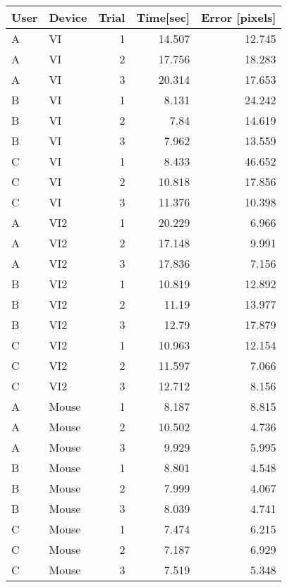 \begin{tabular}{llrrr}
 \toprule
 User & Device & Trial & Time[sec] & Error [pixels] \\
 \midrule
A	&	VI	&	1	&	14.507	&	12.745	\\
A	&	VI	&	2	&	17.756	&	18.283	\\
A	&	VI	&	3	&	20.314	&	17.653	\\
B	&	VI	&	1	&	8.131	&	24.242	\\
B	&	VI	&	2	&	7.84	&	14.619	\\
B	&	VI	&	3	&	7.962	&	13.559	\\
C	&	VI	&	1	&	8.433	&	46.652	\\
C	&	VI	&	2	&	10.818	&	17.856	\\
C	&	VI	&	3	&	11.376	&	10.398	\\
A	&	VI2	&	1	&	20.229	&	6.966	\\
A	&	VI2	&	2	&	17.148	&	9.991	\\
A	&	VI2	&	3	&	17.836	&	7.156	\\
B	&	VI2	&	1	&	10.819	&	12.892	\\
B	&	VI2	&	2	&	11.19	&	13.977	\\
B	&	VI2	&	3	&	12.79	&	17.879	\\
C	&	VI2	&	1	&	10.963	&	12.154	\\
C	&	VI2	&	2	&	11.597	&	7.066	\\
C	&	VI2	&	3	&	12.712	&	8.156	\\
A	&	Mouse	&	1	&	8.187	&	8.815	\\
A	&	Mouse	&	2	&	10.502	&	4.736	\\
A	&	Mouse	&	3	&	9.929	&	5.995	\\
B	&	Mouse	&	1	&	8.801	&	4.548	\\
B	&	Mouse	&	2	&	7.999	&	4.067	\\
B	&	Mouse	&	3	&	8.039	&	4.741	\\
C	&	Mouse	&	1	&	7.474	&	6.215	\\
C	&	Mouse	&	2	&	7.187	&	6.929	\\
C	&	Mouse	&	3	&	7.519	&	5.348	\\
 \bottomrule
\end{tabular}
